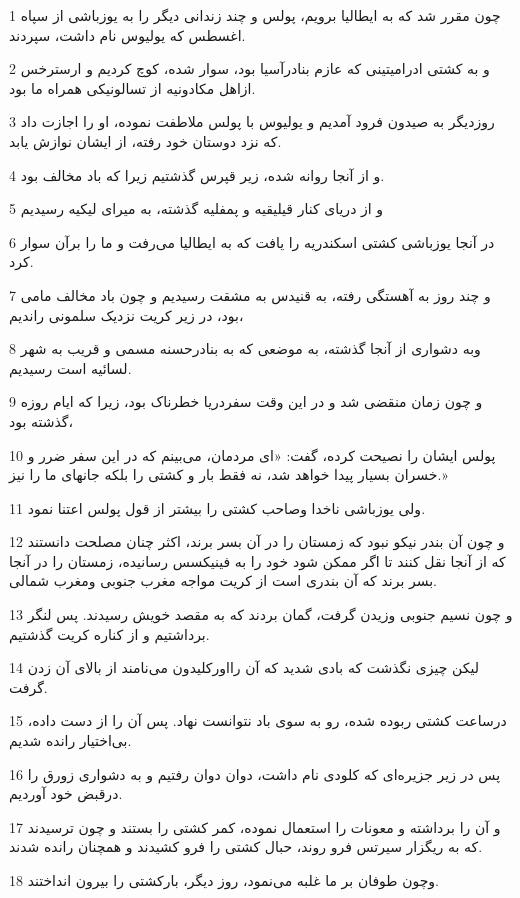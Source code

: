 \par 1 چون مقرر شد که به ایطالیا برویم، پولس و چند زندانی دیگر را به یوزباشی از سپاه اغسطس که یولیوس نام داشت، سپردند.
\par 2 و به کشتی ادرامیتینی که عازم بنادرآسیا بود، سوار شده، کوچ کردیم و ارسترخس ازاهل مکادونیه از تسالونیکی همراه ما بود.
\par 3 روزدیگر به صیدون فرود آمدیم و یولیوس با پولس ملاطفت نموده، او را اجازت داد که نزد دوستان خود رفته، از ایشان نوازش یابد.
\par 4 و از آنجا روانه شده، زیر قپرس گذشتیم زیرا که باد مخالف بود.
\par 5 و از دریای کنار قیلیقیه و پمفلیه گذشته، به میرای لیکیه رسیدیم
\par 6 در آنجا یوزباشی کشتی اسکندریه را یافت که به ایطالیا می‌رفت و ما را برآن سوار کرد.
\par 7 و چند روز به آهستگی رفته، به قنیدس به مشقت رسیدیم و چون باد مخالف مامی بود، در زیر کریت نزدیک سلمونی راندیم،
\par 8 وبه دشواری از آنجا گذشته، به موضعی که به بنادرحسنه مسمی و قریب به شهر لسائیه است رسیدیم.
\par 9 و چون زمان منقضی شد و در این وقت سفردریا خطرناک بود، زیرا که ایام روزه گذشته بود،
\par 10 پولس ایشان را نصیحت کرده، گفت: «ای مردمان، می‌بینم که در این سفر ضرر و خسران بسیار پیدا خواهد شد، نه فقط بار و کشتی را بلکه جانهای ما را نیز.»
\par 11 ولی یوزباشی ناخدا وصاحب کشتی را بیشتر از قول پولس اعتنا نمود.
\par 12 و چون آن بندر نیکو نبود که زمستان را در آن بسر برند، اکثر چنان مصلحت دانستند که از آنجا نقل کنند تا اگر ممکن شود خود را به فینیکسس رسانیده، زمستان را در آنجا بسر برند که آن بندری است از کریت مواجه مغرب جنوبی ومغرب شمالی.
\par 13 و چون نسیم جنوبی وزیدن گرفت، گمان بردند که به مقصد خویش رسیدند. پس لنگر برداشتیم و از کناره کریت گذشتیم.
\par 14 لیکن چیزی نگذشت که بادی شدید که آن رااورکلیدون می‌نامند از بالای آن زدن گرفت.
\par 15 درساعت کشتی ربوده شده، رو به سوی باد نتوانست نهاد. پس آن را از دست داده، بی‌اختیار رانده شدیم.
\par 16 پس در زیر جزیره‌ای که کلودی نام داشت، دوان دوان رفتیم و به دشواری زورق را درقبض خود آوردیم.
\par 17 و آن را برداشته و معونات را استعمال نموده، کمر کشتی را بستند و چون ترسیدند که به ریگزار سیرتس فرو روند، حبال کشتی را فرو کشیدند و همچنان رانده شدند.
\par 18 وچون طوفان بر ما غلبه می‌نمود، روز دیگر، بارکشتی را بیرون انداختند.
